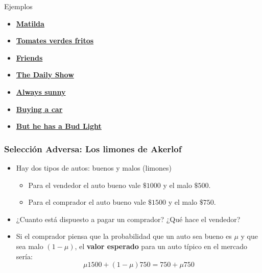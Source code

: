 \documentclass{beamer}
\begin{document}
\begin{frame}{Ejemplos}
    \begin{itemize}
    \item \href{https://www.youtube.com/watch?v=qlg0qakJhKU}{\textbf{Matilda}}
    \item \href{https://www.youtube.com/watch?v=akA8co61He4}{\textbf{Tomates verdes fritos}}
    \item \href{https://www.youtube.com/watch?v=X8BPfLhH6MA}{\textbf{Friends}}
    \item \href{https://videos.criticalcommons.org/media/encoded/16/jtierney86/43ba1b1ac3e94df3974f987cc912ae_Hxgbfl1.mp4}{\textbf{The Daily Show}}
    \item \href{http://videos.criticalcommons.org/transcoded/http/www.criticalcommons.org/Members/JJWooten/clips/always-sunny-paying-for-care/video_file/mp4-high/always-sunny-cost-of-care-mp4.mp4}{\textbf{Always sunny}}
    \item \href{https://www.youtube.com/watch?v=SrPu-xGrKrk}{\textbf{Buying a car}}
    \item \href{https://www.youtube.com/watch?v=ZZq0ShjEd-E}{\textbf{But he has a Bud Light}}
    \end{itemize}
\end{frame}

\begin{frame} \label{hdos}
\frametitle{Selección Adversa: Los limones de Akerlof}
    \begin{itemize}
        \item Hay dos tipos de autos: buenos y malos (limones)
        \begin{itemize}
            \item Para el vendedor el auto bueno vale $\$1000$ y el malo $\$500$.
            \item Para el comprador el auto bueno vale $\$1500$ y el malo $\$750$.
        \end{itemize}
        \item ¿Cuanto está dispuesto a pagar un comprador? ¿Qué hace el vendedor?
        \item Si el comprador piensa que la probabilidad que un auto sea bueno es $\mu$ y que sea malo  $(1-\mu)$, el \textbf{valor esperado} para un auto típico en el mercado sería:
        \[\mu 1500 + (1-\mu) 750= 750 + \mu 750\] 
    \end{itemize}

\end{frame}
\end{document}
